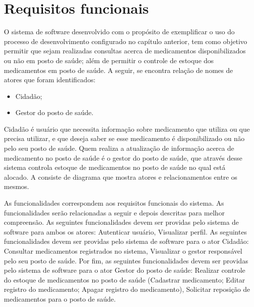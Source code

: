 

\section{Requisitos funcionais}
\label{sec:visão do sistema}

O sistema de software desenvolvido com o propósito de  exemplificar o uso do processo de desenvolvimento configurado no capítulo anterior, tem como objetivo permitir que sejam realizadas consultas acerca de medicamentos disponibilizados ou não em posto de saúde; além de permitir o controle de estoque dos medicamentos em posto de saúde. A seguir, se encontra relação de nomes de atores que foram identificados:

\begin{itemize}
    \item Cidadão;
    \item Gestor do posto de saúde.
\end{itemize}

%

Cidadão é usuário que necessita informação sobre medicamento que utiliza ou que precisa utilizar, e que deseja saber se esse medicamento é disponibilizado ou não pelo seu posto de saúde. Quem realiza a atualização de informação acerca de medicamento no posto de saúde é o gestor do posto de saúde, que através desse sistema controla estoque de medicamentos no posto de saúde no qual está alocado. A  consiste de diagrama que mostra atores e relacionamentos entre os mesmos.

As funcionalidades correspondem aos requisitos funcionais do sistema. As funcionalidades serão relacionadas a seguir e depois descritas para melhor compreensão. As seguintes funcionalidades devem ser providas pelo sistema de software para ambos os atores: Autenticar usuário, Visualizar perfil. As seguintes  funcionalidades devem ser providas pelo sistema de software para o ator Cidadão: Consultar medicamentos registrados no sistema, Visualizar o gestor responsável pelo seu posto de saúde. Por fim, as seguintes funcionalidades devem ser providas pelo sistema de software para o ator Gestor do posto de saúde: Realizar controle do estoque de medicamentos no posto de saúde (Cadastrar medicamento; Editar registro do medicamento; Apagar registro do medicamento), Solicitar reposição de medicamentos para o posto de saúde.

